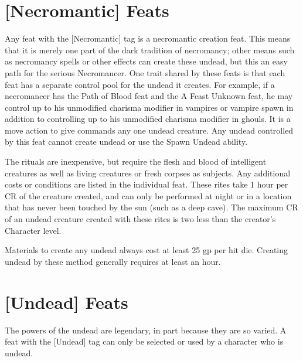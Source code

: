 	\begin{multicols}{2}

		

	\end{multicols}

\section{[Necromantic] Feats} \label{feats:necromantic}


Any feat with the [Necromantic] tag is a necromantic creation feat. This means that it is merely one part of the dark tradition of necromancy; other means such as necromancy spells or other effects can create these undead, but this an easy path for the serious Necromancer. One trait shared by these feats is that each feat has a separate control pool for the undead it creates. For example, if a necromancer has the Path of Blood feat and the A Feast Unknown feat, he may control up to his unmodified charisma modifier in vampires or vampire spawn in addition to controlling up to his unmodified charisma modifier in ghouls. It is a move action to give commands any one undead creature. Any undead controlled by this feat cannot create undead or use the Spawn Undead ability.

The rituals are inexpensive, but require the flesh and blood of intelligent creatures as well as living creatures or fresh corpses as subjects. Any additional costs or conditions are listed in the individual feat. These rites take 1 hour per CR of the creature created, and can only be performed at night or in a location that has never been touched by the sun (such as a deep cave). The maximum CR of an undead creature created with these rites is two less than the creator's Character level.

Materials to create any undead always cost at least 25 gp per hit die. Creating undead by these method generally requires at least an hour.\\


	\begin{multicols}{2}

		

	\end{multicols}

\section{[Undead] Feats}

The powers of the undead are legendary, in part because they are so varied. A feat with the [Undead] tag can only be selected or used by a character who is undead.\\

	\begin{multicols}{2}

	

	\end{multicols}